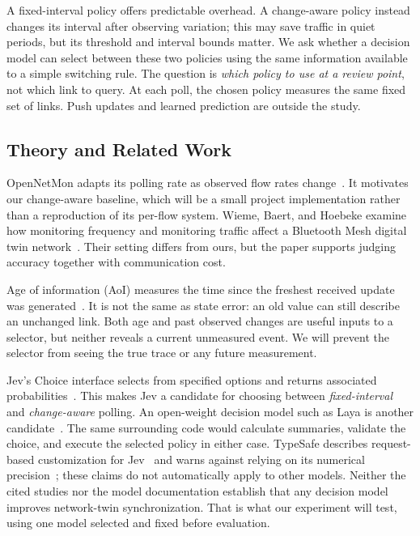 \documentclass[11pt,a4paper]{article}
\begin{document}
A fixed-interval policy offers predictable overhead. A change-aware policy instead changes its interval after observing variation; this may save traffic in quiet periods, but its threshold and interval bounds matter. We ask whether a decision model can select between these two policies using the same information available to a simple switching rule. The question is \emph{which policy to use at a review point}, not which link to query. At each poll, the chosen policy measures the same fixed set of links. Push updates and learned prediction are outside the study.

\subsection{Theory and Related Work}
OpenNetMon adapts its polling rate as observed flow rates change~\cite{opennetmon}. It motivates our change-aware baseline, which will be a small project implementation rather than a reproduction of its per-flow system. Wieme, Baert, and Hoebeke examine how monitoring frequency and monitoring traffic affect a Bluetooth Mesh digital twin network~\cite{wieme}. Their setting differs from ours, but the paper supports judging accuracy together with communication cost.

Age of information (AoI) measures the time since the freshest received update was generated~\cite{yates}. It is not the same as state error: an old value can still describe an unchanged link. Both age and past observed changes are useful inputs to a selector, but neither reveals a current unmeasured event. We will prevent the selector from seeing the true trace or any future measurement.

Jev's Choice interface selects from specified options and returns associated probabilities~\cite{choice}. This makes Jev a candidate for choosing between \emph{fixed-interval} and \emph{change-aware} polling. An open-weight decision model such as Laya is another candidate~\cite{laya}. The same surrounding code would calculate summaries, validate the choice, and execute the selected policy in either case. TypeSafe describes request-based customization for Jev~\cite{models} and warns against relying on its numerical precision~\cite{limits}; these claims do not automatically apply to other models. Neither the cited studies nor the model documentation establish that any decision model improves network-twin synchronization. That is what our experiment will test, using one model selected and fixed before evaluation.
\end{document}
